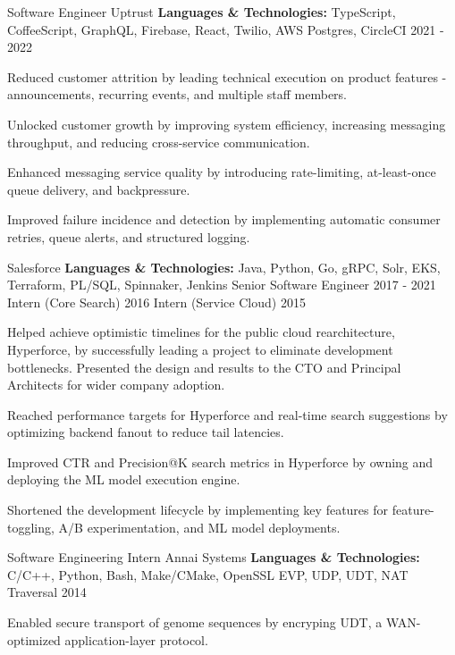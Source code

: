 
\begin{cventries}
  \cventry
    {Software Engineer}
    {Uptrust}
    {\textbf{Languages \& Technologies:} TypeScript, CoffeeScript, GraphQL, Firebase, React, Twilio, AWS Postgres, CircleCI}
    {2021 - 2022}
    {
      \begin{cvitems}
        \item {Reduced customer attrition by leading technical execution on product features - announcements, recurring events, and multiple staff members.}
        \item {Unlocked customer growth by improving system efficiency, increasing messaging throughput, and reducing cross-service communication.}
        \item {Enhanced messaging service quality by introducing rate-limiting, at-least-once queue delivery, and backpressure.}
        \item {Improved failure incidence and detection by implementing automatic consumer retries, queue alerts, and structured logging.}
      \end{cvitems}
    }

  \cvthreeentry
    {Salesforce}
    {\textbf{Languages \& Technologies:} Java, Python, Go, gRPC, Solr, EKS, Terraform, PL/SQL, Spinnaker, Jenkins}
    {Senior Software Engineer}
    {2017 - 2021}
    {Intern (Core Search)}
    {2016}
    {Intern (Service Cloud)}
    {2015}
    {
      \begin{cvitems}
        \item {Helped achieve optimistic timelines for the public cloud rearchitecture, Hyperforce, by successfully leading a project to eliminate development bottlenecks. Presented the design and results to the CTO and Principal Architects for wider company adoption.}
        \item {Reached performance targets for Hyperforce and real-time search suggestions by optimizing backend fanout to reduce tail latencies.}
        \item {Improved CTR and Precision@K search metrics in Hyperforce by owning and deploying the ML model execution engine.}
        \item {Shortened the development lifecycle by implementing key features for feature-toggling, A/B experimentation, and ML model deployments.}
      \end{cvitems}
    }

  \cventry
    {Software Engineering Intern}
    {Annai Systems}
    {\textbf{Languages \& Technologies:} C/C++, Python, Bash, Make/CMake, OpenSSL EVP, UDP, UDT, NAT Traversal}
    {2014}
    {
      \begin{cvitems}
        \item {Enabled secure transport of genome sequences by encryping UDT, a WAN-optimized application-layer protocol.}
      \end{cvitems}
    }
\end{cventries}
